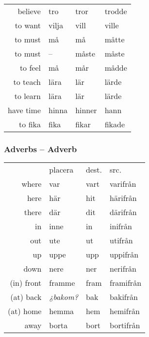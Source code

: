 \documentclass[14pt]{refcard} %
\begin{document}
\begin{tabular}{@{}rlll}
believe   & tro       & tror      & trodde     \\[1ex]
to want   & vilja     & vill      & ville      \\
to must   & må        & må        & måtte      \\
to must   & --        & måste     & måste      \\
to feel   & må        & mår       & mådde      \\[1ex]
to teach  & lära      & lär       & lärde      \\
to learn  & lära      & lär       & lärde      \\[1ex]
have time & hinna     & hinner    & hann       \\
to fika   & fika      & fikar     & fikade     \\
\end{tabular}


\subsubsection{Adverbs -- Adverb}

\begin{tabular}{rlll}
            & placera & dest. & src. \\[1ex]
where       & var     & vart  & varifrån  \\[.5ex]
here        & här     & hit   & härifrån  \\
there       & där     & dit   & därifrån  \\[.5ex]
in          & inne    & in    & inifrån   \\
out         & ute     & ut    & utifrån   \\[.5ex]
up          & uppe    & upp   & uppifrån  \\
down        & nere    & ner   & nerifrån  \\[.5ex]
(in) front  & framme  & fram  & framifrån \\
(at) back   & \emph{¿bakom?} & bak   & bakifrån \\[.5ex]
(at) home   & hemma   & hem   & hemifrån  \\
away        & borta   & bort  & bortifrån \\[.5ex]
\end{tabular}
\end{document}
